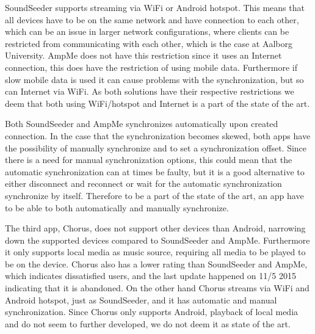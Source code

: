 SoundSeeder supports streaming via WiFi or Android hotspot. 
This means that all devices have to be on the same network and have connection to each other,
which can be an issue in larger network configurations, where clients can be restricted from communicating with each other,
which is the case at Aalborg University.
AmpMe does not have this restriction since it uses an Internet connection, this does have the restriction of using mobile data.
Furthermore if slow mobile data is used it can cause problems with the synchronization, but so can Internet via WiFi. 
As both solutions have their respective restrictions we deem that both using WiFi/hotspot and Internet is a part of the state of the art.

Both SoundSeeder and AmpMe synchronizes automatically upon created connection.
In the case that the synchronization becomes skewed, both apps have the possibility of manually synchronize and to set a synchronization offset.
Since there is a need for manual synchronization options, this could mean that the automatic synchronization can at times be faulty,
but it is a good alternative to either disconnect and reconnect or wait for the automatic synchronization synchronize by itself.
Therefore to be a part of the state of the art, an app have to be able to both automatically and manually synchronize. 

The third app, Chorus, does not support other devices than Android, narrowing down the supported devices compared to SoundSeeder and AmpMe.
Furthermore it only supports local media as music source, requiring all media to be played to be on the device. 
Chorus also has a lower rating than SoundSeeder and AmpMe, which indicates dissatisfied users,
and the last update happened on 11/5 2015 indicating that it is abandoned. 
On the other hand Chorus streams via WiFi and Android hotspot, just as SoundSeeder, and it has automatic and manual synchronization.
Since Chorus only supports Android, playback of local media and do not seem to further developed,
we do not deem it as state of the art.


